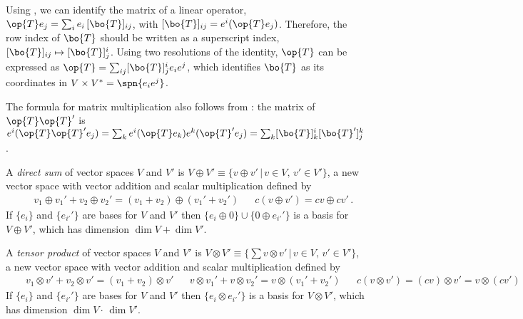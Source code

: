 \documentclass[11pt,fleqn]{article}
\numberwithin{equation}{section}
\begin{document}
\begin{pro}\label{resolution-of-the-identity}
\end{pro}

\begin{rmk}
Using , we can identify the matrix of a linear operator, $\op{T}e_j=\sum_ie_i\,[\bo{T}]_{ij}$, with $[\bo{T}]_{ij}=e^i(\op{T}e_j)$.
Therefore, the row index of $\bo{T}$ should be written as a superscript index, $[\bo{T}]_{ij}\mapsto[\bo{T}]^i_j$.
Using two resolutions of the identity, $\op{T}$ can be expressed as $\op{T}=\sum_{ij}[\bo{T}]_j^ie_ie^j$, which identifies $\bo{T}$ as its coordinates in $V\times V^*=\spn\{e_ie^j\}$.
\end{rmk}

\begin{rmk}
The formula for matrix multiplication also follows from :
the matrix of $\op{T}\op{T}'$ is $e^i(\op{T}\op{T}'e_j)=\sum_ke^i(\op{T}e_k)e^k(\op{T}'e_j)=\sum_k[\bo{T}]^i_k[\bo{T}']^k_j$.
\end{rmk}

\begin{dfn}\label{direct-sum-v-oplus-v'}
A \textit{direct sum} of vector spaces $V$ and $V'$ is $V\oplus V'\equiv\{v\oplus v'\,|\,v\in V,\,v'\in V'\}$, a new vector space with vector addition and scalar multiplication defined by
\begin{align}
&&
  v_1\oplus v_1'
+
  v_2\oplus v_2'
=
  (v_1 + v_2)
\oplus
  (v_1' + v_2')
&&
  c(v\oplus v')
=
  cv\oplus cv'\,.
\end{align}
If $\{e_i\}$ and $\{e_{i'}'\}$ are bases for $V$ and $V'$ then $\{e_i\oplus0\}\cup\{0\oplus e_{i'}'\}$ is a basis for $V\oplus V'$, which has dimension $\dim V+\dim V'$.
\end{dfn}

\begin{dfn}\label{tensor-product-v-otimes-v'}
A \textit{tensor product} of vector spaces $V$ and $V'$ is $V\otimes V'\equiv\{\sum v\otimes v'\,|\,v\in V,\,v'\in V'\}$, a new vector space with vector addition and scalar multiplication defined by
\begin{align}
&&
  v_1\otimes v'
+
  v_2\otimes v'
=
  (v_1 + v_2)\otimes v'
&&
  v\otimes v_1'
+
  v\otimes v_2'
=
  v\otimes(v_1' + v_2')
&&
  c(v\otimes v')
=
  (cv)\otimes v'
=
  v\otimes(cv')
\end{align}
If $\{e_i\}$ and $\{e_{i'}'\}$ are bases for $V$ and $V'$ then $\{e_i\otimes e_{i'}'\}$ is a basis for $V\otimes V'$, which has dimension $\dim V\cdot\,\dim V'$.
\end{dfn}
\end{document}
